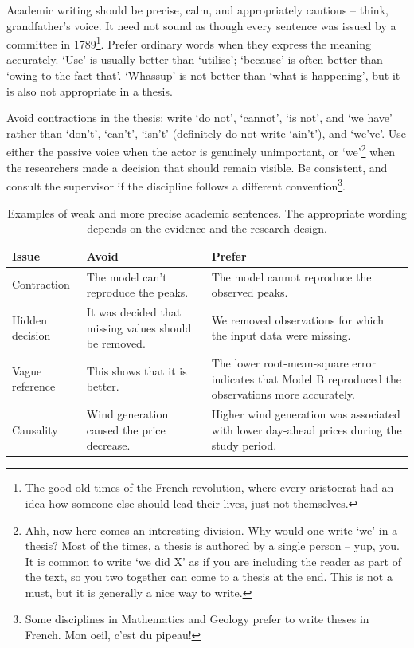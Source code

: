 \documentclass[masters,en,listoffigures,listoftables,acronyms]{NMBU}
\begin{document}
Academic writing should be precise, calm, and appropriately cautious -- think, grandfather's voice.
It need not sound as though every sentence was issued by a committee in 1789\footnote{The good old times of the French revolution, where every aristocrat had an idea how someone else should lead their lives, just not themselves.}.
Prefer ordinary words when they express the meaning accurately.
`Use' is usually better than `utilise'; `because' is often better than `owing to the fact that'.
`Whassup' is not better than `what is happening', but it is also not appropriate in a thesis.

Avoid contractions in the thesis: write `do not', `cannot', `is not', and `we have' rather than `don't', `can't', `isn't' (definitely do not write `ain't'), and `we've'.
Use either the passive voice when the actor is genuinely unimportant, or `we'\footnote{Ahh, now here comes an interesting division. Why would one write `we' in a thesis? Most of the times, a thesis is authored by a single person -- yup, you. It is common to write `we did X' as if you are including the reader as part of the text, so you two together can come to a thesis at the end. This is not a must, but it is generally a nice way to write.} when the researchers made a decision that should remain visible.
Be consistent, and consult the supervisor if the discipline follows a different convention\footnote{Some disciplines in Mathematics and Geology prefer to write theses in French. Mon oeil, c'est du pipeau!}.


\begin{table}[ht]
  \centering
  \small
  \caption[Examples of clearer academic sentences]{Examples of weak and more
  precise academic sentences. The appropriate wording depends on the evidence and the research design.}
  \label{tab:academic-voice}
  \begin{tabularx}{\textwidth}{@{}p{}YY@{}}
    \toprule
    Issue & Avoid & Prefer \\
    \midrule
    Contraction
      & The model can't reproduce the peaks.
      & The model cannot reproduce the observed peaks. \\
    \addlinespace
    Hidden decision
      & It was decided that missing values should be removed.
      & We removed observations for which the input data were missing. \\
    \addlinespace
    Vague reference
      & This shows that it is better.
      & The lower root-mean-square error indicates that Model B reproduced the observations more accurately. \\
    \addlinespace
    Causality
      & Wind generation caused the price decrease.
      & Higher wind generation was associated with lower day-ahead prices during the study period. \\
    \bottomrule
  \end{tabularx}
\end{table}
\end{document}

